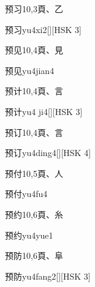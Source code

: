 \begin{entry}{预习}{10,3}{⾴、⼄}
  \begin{phonetics}{预习}{yu4xi2}[][HSK 3]
  \end{phonetics}
\end{entry}

\begin{entry}{预见}{10,4}{⾴、⾒}
  \begin{phonetics}{预见}{yu4jian4}
  \end{phonetics}
\end{entry}

\begin{entry}{预计}{10,4}{⾴、⾔}
  \begin{phonetics}{预计}{yu4 ji4}[][HSK 3]
  \end{phonetics}
\end{entry}

\begin{entry}{预订}{10,4}{⾴、⾔}
  \begin{phonetics}{预订}{yu4ding4}[][HSK 4]
  \end{phonetics}
\end{entry}

\begin{entry}{预付}{10,5}{⾴、⼈}
  \begin{phonetics}{预付}{yu4fu4}
  \end{phonetics}
\end{entry}

\begin{entry}{预约}{10,6}{⾴、⽷}
  \begin{phonetics}{预约}{yu4yue1}
  \end{phonetics}
\end{entry}

\begin{entry}{预防}{10,6}{⾴、⾩}
  \begin{phonetics}{预防}{yu4fang2}[][HSK 3]
  \end{phonetics}
\end{entry}

